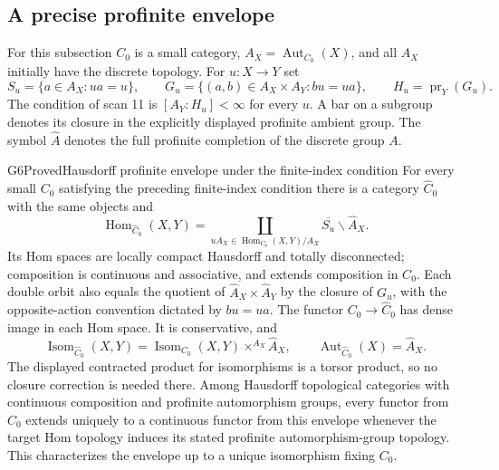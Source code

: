\subsection{A precise profinite envelope}

For this subsection $C_0$ is a small category, $A_X=\operatorname{Aut}_{C_0}(X)$,
and all $A_X$ initially have the discrete topology. For $u:X\to Y$ set
\[
 S_u=\{a\in A_X:ua=u\},\qquad
 G_u=\{(a,b)\in A_X\times A_Y:bu=ua\},\qquad
 H_u=\operatorname{pr}_Y(G_u).
\]
The condition of scan 11 is $[A_Y:H_u]<\infty$ for every $u$.
A bar on a subgroup denotes its closure in the explicitly displayed
profinite ambient group. The symbol $\widehat A$ denotes the full
profinite completion of the discrete group $A$.

\begin{result}{G6}{Proved}{Hausdorff profinite envelope under the finite-index condition}
For every small $C_0$ satisfying the preceding finite-index condition
there is a category $\widehat C_0$ with the same objects and
\[
 \operatorname{Hom}_{\widehat C_0}(X,Y)=
 \coprod_{uA_X\in\operatorname{Hom}_{C_0}(X,Y)/A_X}
       \overline{S_u}\backslash\widehat A_X.                 \tag{G.1}
\]
Its Hom spaces are locally compact Hausdorff and totally disconnected;
composition is continuous and associative, and extends composition in
$C_0$. Each double orbit also equals the quotient of
$\widehat A_X\times\widehat A_Y$ by the closure of $G_u$, with the
opposite-action convention dictated by $bu=ua$.
The functor $C_0\to\widehat C_0$ has dense image in each Hom space.
It is conservative, and
\[
 \operatorname{Isom}_{\widehat C_0}(X,Y)=
 \operatorname{Isom}_{C_0}(X,Y)
       \mathop{\times}^{A_X}\widehat A_X,
 \qquad \operatorname{Aut}_{\widehat C_0}(X)=\widehat A_X.     \tag{G.2}
\]
The displayed contracted product for isomorphisms is a torsor product,
so no closure correction is needed there. Among Hausdorff topological
categories with continuous composition and profinite automorphism
groups, every functor from $C_0$ extends uniquely to a continuous functor
from this envelope whenever the target Hom topology induces its stated
profinite automorphism-group topology. This characterizes the envelope
up to a unique isomorphism fixing $C_0$.
\end{result}
